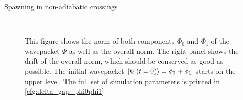 \begin{chapter}{Spawning in non-adiabatic crossings}
\begin{figure}[h!]
  \centering
   \\
  \caption[Norms and norm drift for a superposition $\phi_0+\phi_1$ in an avoided crossing]{
  This figure shows the norm of both components $\Phi_0$ and $\Phi_1$ of the
  wavepacket $\Psi$ as well as the overall norm. The right panel shows the drift
  of the overall norm, which should be conserved as good as possible.
  The initial wavepacket $\Ket{\Psi\left( t=0 \right)} = \phi_0 + \phi_1$ starts on the
  upper level. The full set of simulation parameters is printed in \ref{cfg:delta_gap_phi0phi1}
  \label{fig:basic_delta_gap_phi0phi1_norms}
  }
\end{figure}



\end{chapter}
